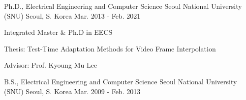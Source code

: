 

\begin{cventries}

  \cventry
    {Ph.D., Electrical Engineering and Computer Science} %
    {Seoul National University (SNU)} %
    {Seoul, S. Korea} %
    {Mar. 2013 - Feb. 2021} %
    {
      \begin{cvitems} %
        \item {Integrated Master \& Ph.D in EECS}
        \item {Thesis: Test-Time Adaptation Methods for Video Frame Interpolation}
        \item {Advisor: Prof. Kyoung Mu Lee}
      \end{cvitems}
    }

  \cventry
    {B.S., Electrical Engineering and Computer Science} %
    {Seoul National University (SNU)} %
    {Seoul, S. Korea} %
    {Mar. 2009 - Feb. 2013} %
    {}

\end{cventries}
